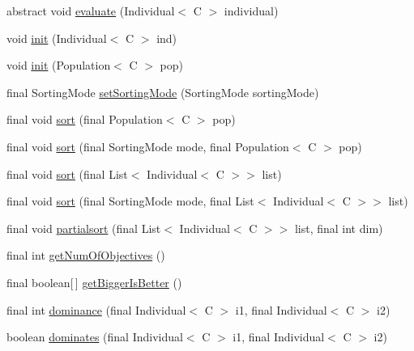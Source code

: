\begin{DoxyCompactItemize}
\item 
abstract void \hyperlink{classjenes_1_1population_1_1_fitness_3_01_c_01extends_01_chromosome_01_4_a1e93c0c2af37eb586fe77ad1dc8df761}{evaluate} (Individual$<$ C $>$ individual)
\item 
void \hyperlink{classjenes_1_1population_1_1_fitness_3_01_c_01extends_01_chromosome_01_4_a1b67ac3ad38e0d5ce0ba6a75708a5e2d}{init} (Individual$<$ C $>$ ind)
\item 
void \hyperlink{classjenes_1_1population_1_1_fitness_3_01_c_01extends_01_chromosome_01_4_afc31605de5bbaae2ca16718628c72847}{init} (Population$<$ C $>$ pop)
\item 
final Sorting\-Mode \hyperlink{classjenes_1_1population_1_1_fitness_3_01_c_01extends_01_chromosome_01_4_a8741e8d5e0045bce51edbe0d58b32e0d}{set\-Sorting\-Mode} (Sorting\-Mode sorting\-Mode)
\item 
final void \hyperlink{classjenes_1_1population_1_1_fitness_3_01_c_01extends_01_chromosome_01_4_a99d06b2b20048c7279139381247678c0}{sort} (final Population$<$ C $>$ pop)
\item 
final void \hyperlink{classjenes_1_1population_1_1_fitness_3_01_c_01extends_01_chromosome_01_4_a939407da23b7bfed0f12233a74690e46}{sort} (final Sorting\-Mode mode, final Population$<$ C $>$ pop)
\item 
final void \hyperlink{classjenes_1_1population_1_1_fitness_3_01_c_01extends_01_chromosome_01_4_a966f1a594a9eed5607e27222fd27e696}{sort} (final List$<$ Individual$<$ C $>$$>$ list)
\item 
final void \hyperlink{classjenes_1_1population_1_1_fitness_3_01_c_01extends_01_chromosome_01_4_a3b46414d970cf62539adcd5a3e065268}{sort} (final Sorting\-Mode mode, final List$<$ Individual$<$ C $>$$>$ list)
\item 
final void \hyperlink{classjenes_1_1population_1_1_fitness_3_01_c_01extends_01_chromosome_01_4_a1f054be21d8801e9485f7ba08ff62db4}{partialsort} (final List$<$ Individual$<$ C $>$$>$ list, final int dim)
\item 
final int \hyperlink{classjenes_1_1population_1_1_fitness_3_01_c_01extends_01_chromosome_01_4_a2c1cb27db38fde35b764b0bf88e7c7f3}{get\-Num\-Of\-Objectives} ()
\item 
final boolean\mbox{[}$\,$\mbox{]} \hyperlink{classjenes_1_1population_1_1_fitness_3_01_c_01extends_01_chromosome_01_4_a87d1d2a0a3758dbaedd78197c335e6a5}{get\-Bigger\-Is\-Better} ()
\item 
final int \hyperlink{classjenes_1_1population_1_1_fitness_3_01_c_01extends_01_chromosome_01_4_a2027cd00c84c69e1819236ad488a5ab9}{dominance} (final Individual$<$ C $>$ i1, final Individual$<$ C $>$ i2)
\item 
boolean \hyperlink{classjenes_1_1population_1_1_fitness_3_01_c_01extends_01_chromosome_01_4_aafc7666adbe84d7683f1de729b1a3ca5}{dominates} (final Individual$<$ C $>$ i1, final Individual$<$ C $>$ i2)
\end{DoxyCompactItemize}
